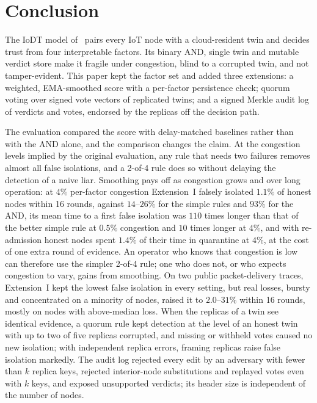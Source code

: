 \section{Conclusion}
\label{sec:conclusion}
The IoDT model of~\cite{soula2024iodt} pairs every IoT node with a
cloud-resident twin and decides trust from four interpretable factors.
Its binary AND, single twin and mutable verdict store make it fragile
under congestion, blind to a corrupted twin, and not tamper-evident.
This paper kept the factor set and added three extensions: a weighted,
EMA-smoothed score with a per-factor persistence check; quorum voting
over signed vote vectors of replicated twins; and a signed Merkle
audit log of verdicts and votes, endorsed by the replicas off the
decision path.

The evaluation compared the score with delay-matched baselines rather
than with the AND alone, and the comparison changes the claim.  At the
congestion levels implied by the original evaluation, any rule that
needs two failures removes almost all false isolations, and a
2-of-4 rule does so without delaying the detection of a naive liar.  Smoothing pays off as
congestion grows and over long operation: at $4\%$ per-factor
congestion Extension~I falsely isolated $1.1\%$ of honest nodes within
16 rounds, against $14$--$26\%$ for the simple rules and $93\%$ for the
AND, its mean time to a first false isolation was $110$ times longer
than that of the better simple rule at $0.5\%$ congestion and $10$
times longer at $4\%$, and with re-admission honest nodes spent
$1.4\%$ of their time in quarantine at $4\%$,
at the cost of one extra round of evidence.  An operator who knows
that congestion is low can therefore use the simpler 2-of-4 rule; one
who does not, or who expects congestion to vary, gains from
smoothing.  On two public packet-delivery traces, Extension~I kept the
lowest false isolation in every setting, but real losses, bursty and
concentrated on a minority of nodes, raised it to $2.0$--$31\%$ within
16 rounds, mostly on nodes with above-median loss.  When the replicas of a twin see identical evidence, a quorum rule
kept detection at the level of an honest twin with up to two of five
replicas corrupted, and missing or withheld votes caused no new
isolation; with independent replica errors, framing replicas raise
false isolation markedly.  The audit log rejected every edit by an
adversary with fewer than $k$ replica keys, rejected interior-node
substitutions and replayed votes even with $k$ keys, and exposed
unsupported verdicts; its header size is independent of the number of
nodes.

